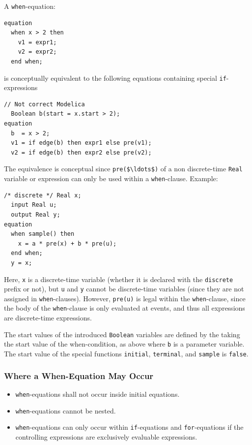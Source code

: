 A \lstinline!when!-equation:
\begin{lstlisting}[language=modelica]
equation
  when x > 2 then
    v1 = expr1;
    v2 = expr2;
  end when;
\end{lstlisting}
is conceptually equivalent to the following equations containing special \lstinline!if!-expressions
\begin{lstlisting}[language=modelica]
  // Not correct Modelica
  Boolean b(start = x.start > 2);
equation
  b  = x > 2;
  v1 = if edge(b) then expr1 else pre(v1);
  v2 = if edge(b) then expr2 else pre(v2);
\end{lstlisting}

\begin{nonnormative}
The equivalence is conceptual since \lstinline!pre($\ldots$)! of a non discrete-time \lstinline!Real! variable or expression can only be used within a \lstinline!when!-clause.
Example:
\begin{lstlisting}[language=modelica]
  /* discrete */ Real x;
  input Real u;
  output Real y;
equation
  when sample() then
    x = a * pre(x) + b * pre(u);
  end when;
  y = x;
\end{lstlisting}

Here, \lstinline!x! is a discrete-time variable (whether it is declared with the \lstinline!discrete! prefix or not), but \lstinline!u! and \lstinline!y! cannot be discrete-time variables
(since they are not assigned in \lstinline!when!-clauses).
However, \lstinline!pre(u)! is legal within the \lstinline!when!-clause, since the body of the \lstinline!when!-clause is only evaluated at events, and thus all expressions are discrete-time expressions.
\end{nonnormative}

The start values of the introduced \lstinline!Boolean! variables are defined by the taking the start value of the when-condition, as above where \lstinline!b! is a parameter variable.
The start value of the special functions \lstinline!initial!, \lstinline!terminal!, and \lstinline!sample! is \lstinline!false!.


\subsubsection{Where a When-Equation May Occur}\label{restrictions-on-where-a-when-equation-may-occur}\label{where-a-when-equation-may-occur}

\begin{itemize}
\item
  \lstinline!when!-equations shall not occur inside initial equations.
\item
  \lstinline!when!-equations cannot be nested.
\item
  \lstinline!when!-equations can only occur within \lstinline!if!-equations and \lstinline!for!-equations if the controlling expressions are exclusively evaluable expressions.
\end{itemize}


